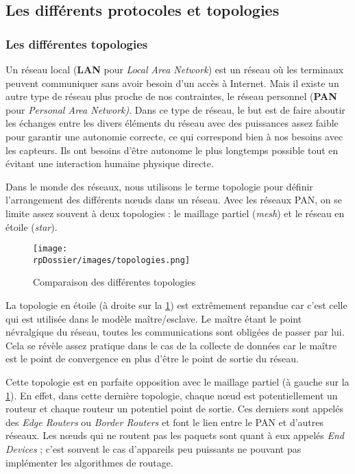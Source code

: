 
\subsection{Les différents protocoles et topologies}

\subsubsection{Les différentes topologies}

Un réseau local (\textbf{LAN} pour \textit{Local Area Network}) est un réseau où les terminaux peuvent communiquer sans avoir besoin d'un accès à Internet. Mais il existe un autre type de réseau plus proche de nos contraintes, le réseau personnel (\textbf{PAN} pour \textit{Personal Area Network)}. Dans ce type de réseau, le but est de faire aboutir les échanges entre les divers éléments du réseau avec des puissances assez faible pour garantir une autonomie correcte, ce qui correspond bien à nos besoins avec les capteurs. Ils ont besoins d'être autonome le plus longtemps possible tout en évitant une interaction humaine physique directe.

Dans le monde des réseaux, nous utilisons le terme topologie pour définir l'arrangement des différents nœuds dans un réseau. Avec les réseaux PAN, on se limite assez souvent à deux topologies : le maillage partiel (\textit{mesh}) et le réseau en étoile (\textit{star}).

\begin{figure}[H]
\centering
\texttt{[image: \\rpDossier/images/topologies.png]}
\caption{Comparaison des différentes topologies}
\label{topologies}
\end{figure}

La topologie en étoile (à droite sur la \cref{topologies}) est extrêmement repandue car c'est celle qui est utilisée dans le modèle maître/esclave. Le maître étant le point névralgique du réseau, toutes les communications sont obligées de passer par lui. Cela se révèle assez pratique dans le cas de la collecte de données car le maître est le point de convergence en plus d'être le point de sortie du réseau.

Cette topologie est en parfaite opposition avec le maillage partiel (à gauche sur la \cref{topologies}). En effet, dans cette dernière topologie, chaque nœud est potentiellement un routeur et chaque routeur un potentiel point de sortie. Ces derniers sont appelés des \textit{Edge Routers} ou \textit{Border Routers} et font le lien entre le PAN et d'autres réseaux. Les nœuds qui ne routent pas les paquets sont quant à eux appelés \textit{End Devices} ; c’est souvent le cas d’appareils peu puissants ne pouvant pas implémenter les algorithmes de routage.

